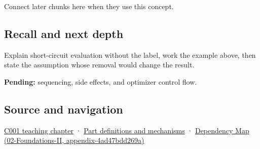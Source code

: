 Connect later chunks here when they use this concept.

\subsection{Recall and next depth}\label{appendix-2e245a6fa8d3-recall-and-next-depth}

Explain short-circuit evaluation without the label, work the example above, then state the assumption whose removal would change the result.

\textbf{Pending:} sequencing, side effects, and optimizer control flow.

\subsection{Source and navigation}\label{appendix-2e245a6fa8d3-source-and-navigation}

\hyperref[01-foundations-i-ch001-from-a-signal-to-an-interpretation]{C001 teaching chapter} · \hyperref[appendix-fd090d982a15]{Part definitions and mechanisms} · \href{../02-Foundations-II/main.pdf\#nameddest=appendix-4ad47bdd269a}{Dependency Map (02-Foundations-II, appendix-4ad47bdd269a)}
